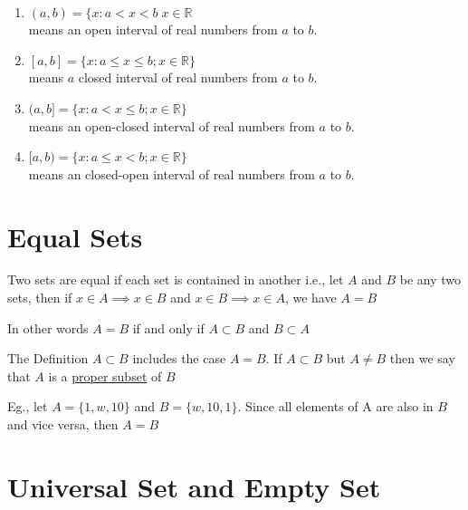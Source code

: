 \begin{examples}
    \mbox{}\\[-\baselineskip] %
    \begin{enumerate}
        \item $(a,b) = \{x:  a<x<b\; x \in \mathbb{R}$\\
              means an open interval of real numbers from $a$ to $b$.
        \item $[a,b] = \{x: a \leq x \leq b; x \in \mathbb{R}\} $\\
              means $a$ closed interval of real numbers from $a$ to $b$.
        \item $(a,b] = \{x: a < x \leq b; x \in \mathbb{R}\} $\\
              means an open-closed interval of real numbers from $a$ to $b$.
        \item $[a,b) = \{x: a \leq x < b; x \in \mathbb{R}\} $\\
              means an closed-open interval of real numbers from $a$ to $b$.
    \end{enumerate}
\end{examples}
\section{Equal Sets}
\begin{definition}
    Two sets are equal if each set is contained in another i.e., let $A$ and $B$ be any two sets, then if $x \in A \implies x \in B$ and $x \in B \implies x \in A$, we have $A = B$
\end{definition}

\begin{para}
    In other words $A=B$ if and only if $A \subset B$ and $B \subset A$
\end{para}
\begin{para}
    The Definition $A \subset B$ includes the case $A=B$. If $A \subset B$ but $A \ne B$ then we say that $A$ is a \underline{proper subset} of $B$
\end{para}

\begin{para}
    Eg., let $A = \{1,w,10\}$ and $B = \{w,10,1\}$. Since all elements of A are also in $B$ and vice versa, then $A = B$
\end{para}
\section{Universal Set and Empty Set}

